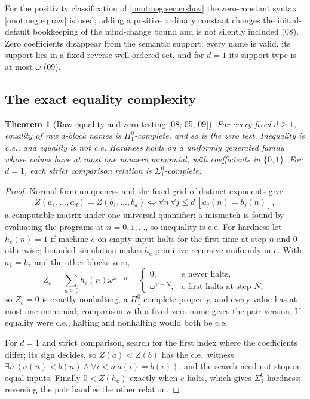\documentclass[11pt,oneside]{article}
\numberwithin{equation}{section}
\newtheorem{theorem}{Theorem}[section]
\theoremstyle{definition}
\theoremstyle{remark}
\newcommand{\src}[1]{\textup{\textsf{\small[#1]}}}
\begin{document}
For the positivity classification of \cref{onot:neg:sec:ershov} the zero-constant
syntax \eqref{onot:neg:eq:raw} is used; adding a positive ordinary constant changes
the initial-default bookkeeping of the mind-change bound and is not silently
included (08). Zero coefficients disappear from the semantic support; every name
is valid, its support lies in a fixed reverse well-ordered set, and for $d=1$ its
support type is at most $\omega$ (09).

\subsection{The exact equality complexity}

\begin{theorem}[Raw equality and zero testing \src{08; 05, 09}]\label{onot:neg:thm:rawequality}
For every fixed $d\ge1$, equality of raw $d$-block names is $\Pi^0_1$-complete,
and so is the zero test. Inequality is c.e., and equality is not c.e. Hardness
holds on a uniformly generated family whose values have at most one nonzero
monomial, with coefficients in $\{0,1\}$. For $d=1$, each strict comparison
relation is $\Sigma^0_1$-complete.
\end{theorem}
\begin{proof}
Normal-form uniqueness and the fixed grid of distinct exponents give
\[
 Z(a_1,\ldots,a_d)=Z(b_1,\ldots,b_d)\iff\forall n\,\forall j\le d\ [a_j(n)=b_j(n)],
\]
a computable matrix under one universal quantifier; a mismatch is found by
evaluating the programs at $n=0,1,\ldots$, so inequality is c.e. For hardness let
$h_e(n)=1$ if machine $e$ on empty input halts for the first time at step $n$ and
$0$ otherwise; bounded simulation makes $h_e$ primitive recursive uniformly in
$e$. With $a_1=h_e$ and the other blocks zero,
\begin{equation}\label{onot:neg:eq:spike}
 Z_e=\sum_{n\ge0}h_e(n)\omega^{\omega-n}=
 \begin{cases}0,&e\text{ never halts},\\ \omega^{\omega-N},&e\text{ first halts at step }N,\end{cases}
\end{equation}
so $Z_e=0$ is exactly nonhalting, a $\Pi^0_1$-complete property, and every value
has at most one monomial; comparison with a fixed zero name gives the pair
version. If equality were c.e., halting and nonhalting would both be c.e.

For $d=1$ and strict comparison, search for the first index where the
coefficients differ; its sign decides, so $Z(a)<Z(b)$ has the c.e.\ witness
$\exists n\,(a(n)<b(n)\wedge\forall i<n\ a(i)=b(i))$, and the search need not stop
on equal inputs. Finally $0<Z(h_e)$ exactly when $e$ halts, which gives
$\Sigma^0_1$-hardness; reversing the pair handles the other relation.
\end{proof}
\end{document}
